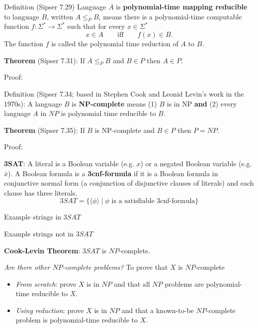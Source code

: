  

Definition (Sipser 7.29) Language  $A$ is {\bf polynomial-time mapping reducible} to language $B$, written $A \leq_P B$,
means there is a polynomial-time computable function $f: \Sigma^* \to \Sigma^*$  such that for every $x \in \Sigma^*$
\[
x \in A \qquad \text{iff} \qquad f(x) \in B.
\]
The  function $f$ is  called the  polynomial time reduction of $A$ to $B$.

{\bf  Theorem}  (Sipser 7.31):  If $A \leq_P B$ and $B  \in P$ then $A \in P$.

Proof: 

\vfill

Definition (Sipser 7.34; based in Stephen Cook and Leonid Levin's work in the 1970s): 
A language $B$ is {\bf  NP-complete} means (1) $B$ is in NP {\bf and}  (2) every language
$A$ in $NP$ is polynomial time reducible to $B$.

{\bf  Theorem}  (Sipser 7.35):  If $B$ is NP-complete and $B \in P$ then $P = NP$.

Proof: 

\vfill

\newpage

{\bf 3SAT}: A literal is a Boolean variable (e.g.  $x$) or a negated Boolean variable (e.g.  $\bar{x}$).  
A Boolean formula is a {\bf  3cnf-formula} if it is a Boolean formula in conjunctive normal form (a conjunction  
of  disjunctive clauses of literals) and each clause  has  three literals.
\[
3SAT  = \{  \langle  \phi \rangle \mid \text{$\phi$ is  a  satisfiable 3cnf-formula} \}
\]


Example strings  in $3SAT$
\vfill



Example  strings not  in $3SAT$

\vfill




{\bf Cook-Levin Theorem}: $3SAT$ is $NP$-complete.


{\it Are there other $NP$-complete problems?} To prove that $X$ is $NP$-complete
\begin{itemize}
\item {\it From scratch}: prove $X$ is in $NP$ and that all $NP$ problems are polynomial-time
reducible to $X$.
\item {\it Using reduction}: prove $X$ is in $NP$ and that a known-to-be $NP$-complete problem 
is polynomial-time reducible to $X$.
\end{itemize}

